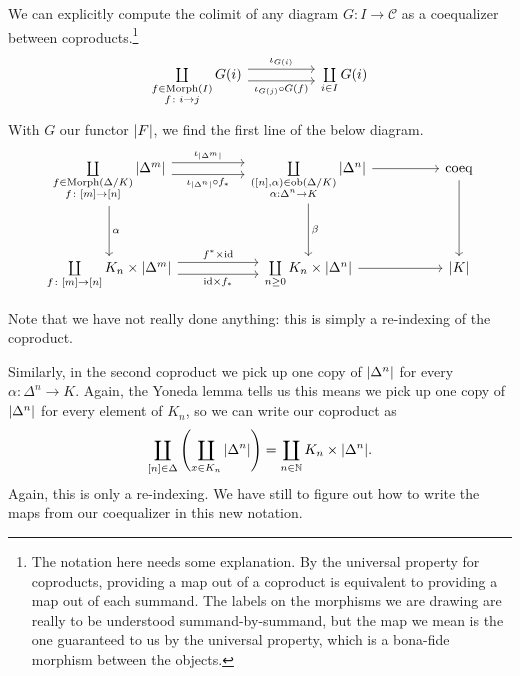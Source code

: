 \documentclass[main.tex]{subfiles}
\begin{document}
We can explicitly compute the colimit of any diagram $G\colon I \to \mathcal{C}$ as a coequalizer between coproducts.\footnote{The notation here needs some explanation. By the universal property for coproducts, providing a map out of a coproduct is equivalent to providing a map out of each summand. The labels on the morphisms we are drawing are really to be understood summand-by-summand, but the map we mean is the one guaranteed to us by the universal property, which is a bona-fide morphism between the objects.}
\begin{equation*}
  \begin{tikzcd}[row sep=huge, column sep=huge]
    \coprod\limits_{\substack{f \in \mathrm{Morph}(I)\\ f\colon i \to j}} G(i)
    \arrow[r, shift left=1.75, "\iota_{G(i)}"]
    \arrow[r, shift right=1.75, swap, "\iota_{G(j)} \circ G(f)"]
    & \coprod\limits_{i \in I} G(i)
  \end{tikzcd}
\end{equation*}
With $G$ our functor ${| F |}$, we find the first line of the below diagram.
\begin{equation*}
  \begin{tikzcd}[row sep=huge, column sep=huge]
    \coprod\limits_{\substack{f \in \mathrm{Morph}(\Delta/K) \\ f\colon [m] \to [n]}} \abs{\Delta^{m}}
    \arrow[r, shift left=1.75, "\iota_{\abs{\Delta^{m}}}"]
    \arrow[r, swap, shift right=1.75, "\iota_{\abs{\Delta^{n}}} \circ  f_{*}"]
    \arrow[d, "\alpha"]
    &
    \coprod\limits_{\substack{([n], \alpha) \in \ob(\Delta/K) \\ \alpha: \Delta^{n} \to K}} \abs{\Delta^{n}}
    \arrow[r]
    \arrow[d, "\beta"]
    & \mathrm{coeq}
    \arrow[d]
    \\
    \coprod\limits_{f\colon [m] \to [n]} K_{n} \times \abs{\Delta^{m}}
    \arrow[r, shift left=1.75, "f^{*} \times \mathrm{id}"]
    \arrow[r, shift right=1.75, swap, "\mathrm{id} \times f_{*}"]
    & \coprod\limits_{n \geq 0} K_{n} \times \abs{\Delta^{n}}
    \arrow[r]
    & \abs{K}
  \end{tikzcd}
\end{equation*}

Note that we have not really done anything: this is simply a re-indexing of the coproduct.

Similarly, in the second coproduct we pick up one copy of ${| \Delta^{n} |}$ for every $\alpha\colon \Delta^{n} \to K$. Again, the Yoneda lemma tells us this means we pick up one copy of ${| \Delta^{n} |}$ for every element of $K_{n}$, so we can write our coproduct as
\begin{equation*}
  \coprod_{[n] \in \Delta}\left( \coprod_{x \in K_{n}} {| \Delta^{n} |} \right) = \coprod_{n \in \mathbb{N}} K_{n} \times {| \Delta^{n} |}.
\end{equation*}
Again, this is only a re-indexing. We have still to figure out how to write the maps from our coequalizer in this new notation.
\end{document}

